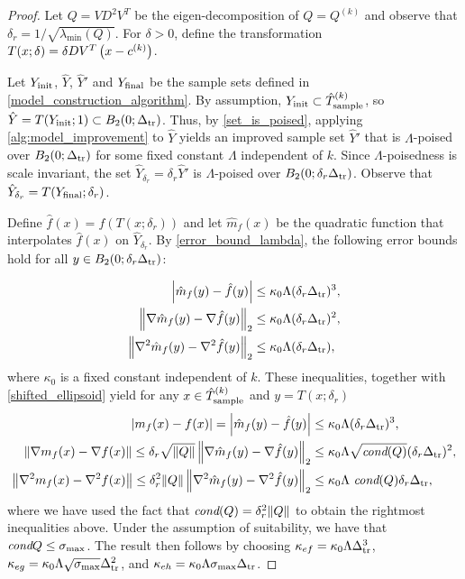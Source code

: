 \documentclass{article}
\begin{document}
\begin{proof}


Let $Q= VD^2V^T$ be the eigen-decomposition of $Q=Q^{(k)}$ and observe that 
$\delta_r = 1/\sqrt{\lambda_{\textrm{min}}(Q)}$.
For $\delta > 0$,  define the transformation $T(x; \delta) = \delta D V^T\left(x - c^{(k)}\right)$. 


Let $Y_{\textrm{init}}$, $\hat{Y}$, $\hat{Y}'$ and $Y_{\textrm{final}}$ be the sample sets defined in \cref{model_construction_algorithm}.   By assumption, $Y_{\textrm{init}} \subset {\hat{T}_{\text{sample}}^{(k)}}$, so $\hat{Y} = T(Y_{\textrm{init}};1) \subset B_2(0;\Delta_{\textrm{tr}})$.   Thus, by \cref{set_is_poised},  applying \cref{alg:model_improvement} to $\hat{Y}$ yields an improved sample set $\hat{Y}'$ that is $\Lambda$-poised over $B_2(0;\Delta_{\textrm{tr}})$ for some fixed constant $\Lambda$ independent of $k$.    Since $\Lambda$-poisedness is scale invariant,  the set $\hat{Y}_{\delta_r} = \delta_r \hat{Y}'$ is $\Lambda$-poised over $B_2(0;\delta_r\Delta_{\textrm{tr}})$.   Observe that $\hat{Y}_{\delta_r} = T(Y_{\textrm{final}};\delta_r)$.  


 Define $\hat{f}(x) = f(T(x;\delta_r))$ and let $\hat{m}_f(x)$ be the quadratic function that interpolates $\hat{f}(x)$ on $\hat{Y}_{\delta_r}$.    By \cref{error_bound_lambda}, the following error bounds hold for all $y \in B_2(0;\delta_r \Delta_{\textrm{tr}})$:

\begin{align}
\left|\hat{m}_f(y)-\hat{f}(y)\right| & \le \kappa_0 \Lambda(\delta_r \Delta_{\textrm{tr}})^3,\\
\left\|\nabla \hat{m}_f(y)-\nabla \hat{f}(y)\right\|_2 & \le \kappa_0 \Lambda (\delta_r\Delta_{\textrm{tr}})^2, \\
\left\|\nabla^2 \hat{m}_f(y)-\nabla^2 \hat{f}(y)\right\|_2 &  \le \kappa_0 \Lambda (\delta_r \Delta_{\textrm{tr}}),
\end{align}
where $\kappa_0$ is a fixed constant independent of $k$.    These inequalities, together with \cref{shifted_ellipsoid} yield for any $x \in {\hat{T}_{\text{sample}}^{(k)}}$ and $y=T(x;\delta_r)$
\begin{align}
\left|m_f(x)-f(x)\right| = \left|\hat{m}_f(y)-\hat{f}(y)\right| & \le \kappa_0 \Lambda(\delta_r \Delta_{\textrm{tr}})^3,\\
\left\|\nabla m_f(x) -\nabla f(x)\right\| \le \delta_r \sqrt{\|Q\|}
\left\|\nabla \hat{m}_f(y)-\nabla \hat{f}(y)\right\|_2 & \le \kappa_0 \Lambda \sqrt{\textit{cond}(Q)} (\delta_r\Delta_{\textrm{tr}})^2, \\
\left\|\nabla^2 m_f(x)-\nabla^2 f(x)\right\| \le \delta_r^2 \|Q\| \left\|\nabla^2 \hat{m}_f(y)-\nabla^2 \hat{f}(y)\right\|_2 &  \le \kappa_0 \Lambda\   \textit{cond}(Q) \delta_r \Delta_{\textrm{tr}},
\end{align}
where we have used the fact that $\textit{cond}(Q)=\delta_r^2 \|Q\|$ to obtain the rightmost inequalities above.    Under the assumption of suitability, we have that $\textit{cond}{Q} \le \sigma_{\textrm{max}}$.   The result then follows by choosing $\kappa_{ef} = \kappa_0 \Lambda \Delta_{\textrm{tr}}^3$, $\kappa_{eg}=\kappa_0 \Lambda \sqrt{\sigma_{\textrm{max}}} \Delta_{\textrm{tr}}^2$, and $\kappa_{eh} = \kappa_0 \Lambda \sigma_{\textrm{max}} \Delta_{\textrm{tr}}$.
\end{proof}
\end{document}
